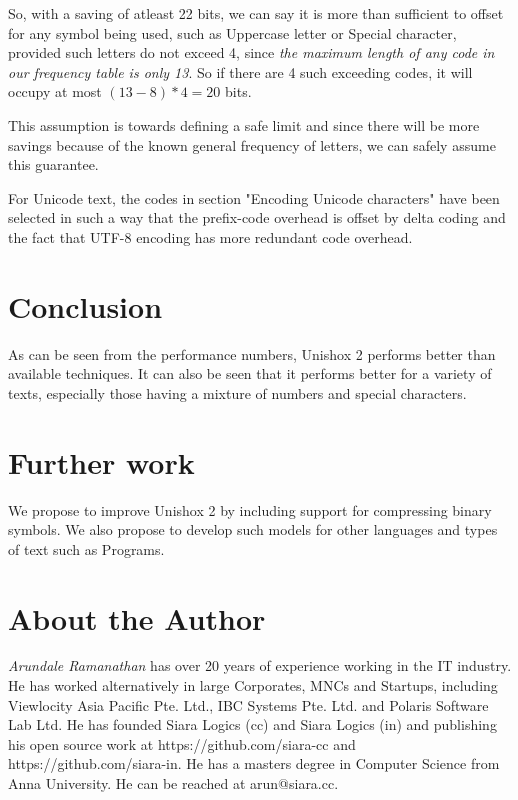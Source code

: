 \documentclass[]{article}
\begin{document}
So, with a saving of atleast 22 bits, we can say it is more than sufficient to offset for any symbol being used, such as Uppercase letter or Special character, provided such letters do not exceed 4, since \emph{the maximum length of any code in our frequency table is only 13}.  So if there are 4 such exceeding codes, it will occupy at most $(13 - 8) * 4 = 20$ bits.

This assumption is towards defining a safe limit and since there will be more savings because of the known general frequency of letters, we can safely assume this guarantee.

For Unicode text, the codes in section "Encoding Unicode characters" have been selected in such a way that the prefix-code overhead is offset by delta coding and the fact that UTF-8 encoding has more redundant code overhead.

\section{Conclusion}

As can be seen from the performance numbers, Unishox 2 performs better than available techniques.  It can also be seen that it performs better for a variety of texts, especially those having a mixture of numbers and special characters.

\section{Further work}

We propose to improve Unishox 2 by including support for compressing binary symbols.  We also propose to develop such models for other languages and types of text such as Programs.

\section{About the Author}

\emph{Arundale Ramanathan} has over 20 years of experience working in the IT industry.  He has worked alternatively in large Corporates, MNCs and Startups, including Viewlocity Asia Pacific Pte. Ltd., IBC Systems Pte. Ltd. and Polaris Software Lab Ltd. He has founded Siara Logics (cc) and Siara Logics (in) and publishing his open source work at https://github.com/siara-cc and https://github.com/siara-in. He has a masters degree in Computer Science from Anna University.  He can be reached at arun@siara.cc.
\end{document}
